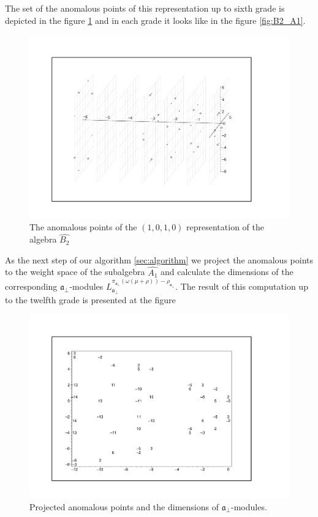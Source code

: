 \documentclass[a4paper,12pt]{article}
\theoremstyle{definition} \newtheorem{Def}{Definition}
\begin{document}
The set of the anomalous points of this representation up to sixth grade is depicted in the figure \ref{fig:affine_B2_anom_point} and in each grade it looks like in the figure \ref{fig:B2_A1}. 

\begin{figure}[h!tb]
  \includegraphics[width=160mm]{AffineB2_A1_Anom.pdf}
  \caption{The anomalous points of the $(1,0,1,0)$ representation of the algebra $\hat{B_2}$}
  \label{fig:affine_B2_anom_point}
\end{figure}

As the next step of our algorithm \ref{sec:algorithm} we project the anomalous points to the weight space of the subalgebra $\hat{A_1}$ and calculate the dimensions of the corresponding $\mathfrak{a}_{\bot}$-modules $L^{\pi_{\mathfrak{a}_{\bot}}(\omega(\mu+\rho))-\rho_{\mathfrak{a}_{\bot}}}_{\mathfrak{a}_{\bot}}$.
The result of this computation up to the twelfth grade is presented at the figure
\begin{figure}[h!tb]
  \centering
  \includegraphics[width=150mm]{AffineB2_A1_proj_anom.pdf}
  \caption{Projected anomalous points and the dimensions of $\mathfrak{a}_{\bot}$-modules.}
  \label{fig:AffineB2_A1_anom_proj}
\end{figure}
\end{document}
